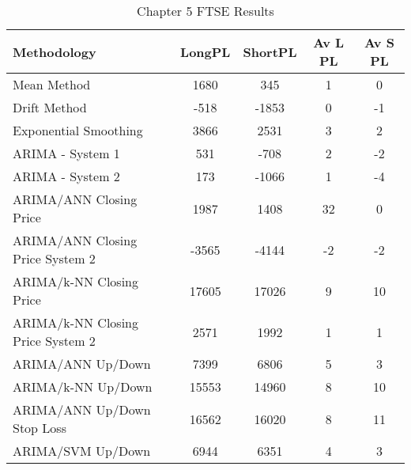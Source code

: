 \begin{table}[ht]
\centering
\caption[Chapter 5 FTSE Results]{Chapter 5 FTSE Results} 
\label{tab:chp6:ftse2_summary}
\begin{tabular}{lcccc}
  \toprule Methodology & LongPL & ShortPL & Av L PL & Av S PL \\ 
  \midrule Mean Method & 1680 & 345 & 1 & 0 \\ 
  Drift Method & -518 & -1853 & 0 & -1 \\ 
  Exponential Smoothing & 3866 & 2531 & 3 & 2 \\ 
  ARIMA - System 1 & 531 & -708 & 2 & -2 \\ 
  ARIMA - System 2 & 173 & -1066 & 1 & -4 \\ 
  ARIMA/ANN Closing Price & 1987 & 1408 & 32 & 0 \\ 
  ARIMA/ANN Closing Price System 2 & -3565 & -4144 & -2 & -2 \\ 
  ARIMA/k-NN Closing Price & 17605 & 17026 & 9 & 10 \\ 
  ARIMA/k-NN Closing Price System 2 & 2571 & 1992 & 1 & 1 \\ 
  ARIMA/ANN Up/Down & 7399 & 6806 & 5 & 3 \\ 
  ARIMA/k-NN Up/Down & 15553 & 14960 & 8 & 10 \\ 
  ARIMA/ANN Up/Down Stop Loss & 16562 & 16020 & 8 & 11 \\ 
  ARIMA/SVM Up/Down & 6944 & 6351 & 4 & 3 \\ 
   \bottomrule \end{tabular}
\end{table}
